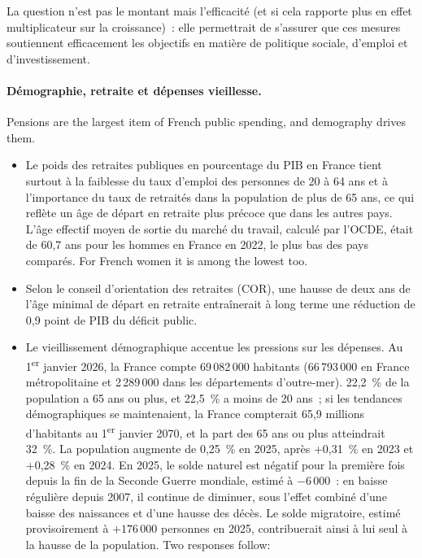 La question n'est pas le montant mais l'efficacité (et si cela rapporte plus en
effet multiplicateur sur la croissance)~: elle permettrait de s'assurer que ces
mesures soutiennent efficacement les objectifs en matière de politique sociale,
d'emploi et d'investissement.

\paragraph{Démographie, retraite et dépenses vieillesse.}
Pensions are the largest item of French public spending, and demography drives
them.
\begin{itemize}
  \item Le poids des retraites publiques en pourcentage du PIB en France tient
    surtout à la faiblesse du taux d'emploi des personnes de 20 à 64 ans et à
    l'importance du taux de retraités dans la population de plus de 65 ans, ce
    qui reflète un âge de départ en retraite plus précoce que dans les autres
    pays. L'âge effectif moyen de sortie du marché du travail, calculé par
    l'OCDE, était de 60,7 ans pour les hommes en France en 2022, le plus bas des
    pays comparés. For French women it is among the lowest too.
  \item Selon le conseil d'orientation des retraites (COR), une hausse de deux
    ans de l'âge minimal de départ en retraite entraînerait à long terme une
    réduction de 0,9 point de PIB du déficit public.
  \item Le vieillissement démographique accentue les pressions sur les dépenses.
    Au 1\textsuperscript{er} janvier 2026, la France compte 69\,082\,000 habitants
    (66\,793\,000 en France métropolitaine et 2\,289\,000 dans les départements
    d'outre-mer). 22,2~\% de la population a 65 ans ou plus, et 22,5~\% a moins
    de 20 ans~; si les tendances démographiques se maintenaient, la France
    compterait 65,9 millions d'habitants au 1\textsuperscript{er} janvier 2070, et
    la part des 65 ans ou plus atteindrait 32~\%. La population augmente de
    0,25~\% en 2025, après +0,31~\% en 2023 et +0,28~\% en 2024. En 2025, le
    solde naturel est négatif pour la première fois depuis la fin de la Seconde
    Guerre mondiale, estimé à $-6\,000$~: en baisse régulière depuis 2007, il
    continue de diminuer, sous l'effet combiné d'une baisse des naissances et
    d'une hausse des décès. Le solde migratoire, estimé provisoirement à
    $+176\,000$ personnes en 2025, contribuerait ainsi à lui seul à la hausse de
    la population. Two responses follow:
    \begin{itemize}

\end{itemize}
\end{itemize}
